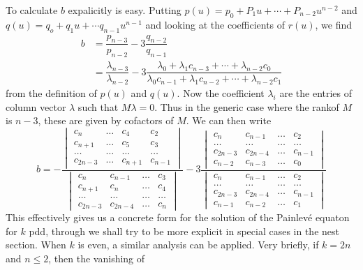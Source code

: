 To calculate $b$ expalicitly is easy. Putting $p(u) = p_{0}+P_{1}u+ \cdots+P_{n-2}u^{n-2}$
and $q(u) =q_{o} +q_{1}u +\cdots q_{n-1}u^{n-1}$ and looking at the coefficients of $r(u)$, we find
\begin{align*}
b &= \dfrac{p_{n-3}}{p_{n-2}}-3\dfrac{q_{n-2}}{q_{n-1}}\\
  &= \dfrac{\lambda_{n-3}}{\lambda_{n-2}}-3\dfrac{\lambda_{0}+\lambda_{1}c_{n-3}+ \cdots + \lambda_{n-2}c_{0}}{\lambda_{0}c_{n-1} + \lambda_{1}c_{n-2}+\cdots + \lambda_{n-2}c_{1}}
\end{align*}
from the definition of $p(u)$ and $q(u)$. Now the coefficient $\lambda_{i}$ are the entries of column vector $\lambda$ such that $M\lambda =0$. Thus in the generic case where the rank\pageoriginale of $M$ is $n-3$, these are given by cofactors of $M$. We can then write
\begin{equation*}\label{chap7-eq-19}
b =
-\dfrac{\begin{vmatrix}
c_{n} & \ldots & c_{4} & c_{2}\\
c_{n+1}& \ldots & c_{5} & c_{3}\\
\ldots & \ldots & \ldots & \ldots\\
c_{2n-3} & \ldots & c_{n+1} & c_{n-1}
\end{vmatrix}}{\begin{vmatrix}
c_{n} & c_{n-1} & \ldots   & c_{3}\\
c_{n+1}& c_{n} &\ldots   & c_{4}\\
\ldots & \ldots & \ldots & \ldots\\
c_{2n-3} & c_{2n-4} & \ldots &  c_{n}
\end{vmatrix}}
-3
\dfrac{\begin{vmatrix}
c_{n} & c_{n-1} & \ldots   & c_{2}\\
\ldots & \ldots & \ldots & \ldots\\
c_{2n-3} & c_{2n-4} & \ldots &  c_{n-1}\\
c_{n-2} & c_{n-3} & \ldots &  c_{0}
\end{vmatrix}}{\begin{vmatrix}
c_{n} & c_{n-1} & \ldots   & c_{2}\\
\ldots & \ldots & \ldots & \ldots\\
c_{2n-3} & c_{2n-4} & \ldots &  c_{n-1}\\
c_{n-1} & c_{n-2} & \ldots &  c_{1}
\end{vmatrix}}\tag{19}
\end{equation*}
This effectively gives us a concrete form for the solution of the Painlev\'e equaton for $k$ pdd, through we shall try to be more explicit in special cases in the nest section. When $k$ is even, a similar analysis can be applied. Very briefly, if $k=2n$ and $n\leq 2$, then the vanishing of
